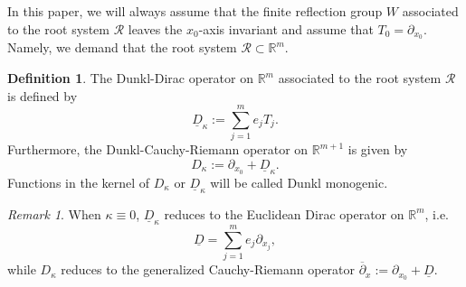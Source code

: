 \documentclass{amsart}
\theoremstyle{definition}
\newtheorem{definition}[theorem]{Definition}
\theoremstyle{remark}
\newtheorem{remark}[theorem]{Remark}
\numberwithin{equation}{section}
\begin{document}
In this  paper, we will always assume that the finite reflection group $W$ associated to the root system $\mathscr{R}$ leaves the $x_{0}$-axis invariant and assume that $T_{0}=\partial_{x_{0}}$. Namely, we demand that the root system $\mathscr{R}\subset \mathbb{R}^{m}$.
\begin{definition}
  The Dunkl-Dirac operator on $\mathbb{R}^{m}$ associated to the root system $\mathscr{R}$ is defined  by
\begin{equation*}
    \underline{D}_{\kappa}:=\sum_{j=1}^{m} e_{j}T_{j}.
\end{equation*}
Furthermore, the Dunkl-Cauchy-Riemann operator on $\mathbb{R}^{m+1}$  is given by
\begin{equation*}
    D_{\kappa}:=\partial_{x_0}+\underline{D}_{\kappa}.
\end{equation*}
Functions in the kernel of $D_\kappa$ or $\underline D_\kappa$ will be called Dunkl monogenic. \end{definition}
\begin{remark} When $\kappa\equiv 0$,   $\underline{D}_{\kappa}$  reduces to the Euclidean  Dirac operator on $\mathbb{R}^{m}$, i.e.
\begin{equation*}
  \underline{D}=\sum_{j=1}^{m} e_{j}\partial_{x_j},
\end{equation*}
while $D_{\kappa}$ reduces to the generalized Cauchy-Riemann operator $\overline{\partial}_{x}:=\partial_{x_0}+\underline{D}.$
\end{remark}
\end{document}
